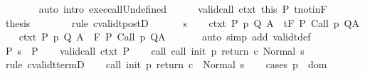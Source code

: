 \begin{isabellebody}
\ \ \ \ \ \ \isamarkupfalse%
\ {\isacharparenleft}auto\ intro{\isacharcolon}\ exec{\isacharunderscore}callUndefined{\isacharparenright}\isanewline
\ \ \ \ \isamarkupfalse%
\ valid{\isacharunderscore}call\ ctxt\ this\ P\ t{\isacharunderscore}notin{\isacharunderscore}F\isanewline
\ \ \ \ \isamarkupfalse%
\ {\isacharquery}thesis\isanewline
\ \ \ \ \ \ \isamarkupfalse%
\ {\isacharparenleft}rule\ cvalidt{\isacharunderscore}postD{\isacharparenright}\isanewline
\ \ \isamarkupfalse%
\isanewline
{}\isamarkupfalse%
\isanewline
\ \ \isamarkupfalse%
\ s\isanewline
\ \ \isamarkupfalse%
\ ctxt{\isacharcolon}\ {\isachardoublequoteopen}{\isasymforall}{\isacharparenleft}P{\isacharcomma}\ p{\isacharcomma}\ Q{\isacharcomma}\ A{\isacharparenright}{\isasymin}{\isasymTheta}{\isachardot}\ {\isasymGamma}\ {\isasymTurnstile}\isactrlsub t\isactrlbsub {\isacharslash}F\isactrlesub \ P\ {\isacharparenleft}Call\ p{\isacharparenright}\ Q{\isacharcomma}A{\isachardoublequoteclose}\isanewline
\ \ \isamarkupfalse%
\ ctxt{\isacharprime}{\isacharcolon}\ {\isachardoublequoteopen}{\isasymforall}{\isacharparenleft}P{\isacharcomma}\ p{\isacharcomma}\ Q{\isacharcomma}\ A{\isacharparenright}{\isasymin}{\isasymTheta}{\isachardot}\ {\isasymGamma}\ {\isasymTurnstile}\isactrlbsub {\isacharslash}F\isactrlesub \ P\ {\isacharparenleft}Call\ p{\isacharparenright}\ Q{\isacharcomma}A{\isachardoublequoteclose}\ \isanewline
\ \ \ \ \isamarkupfalse%
\ {\isacharparenleft}auto\ simp\ add{\isacharcolon}\ validt{\isacharunderscore}def{\isacharparenright}\isanewline
\ \ \isamarkupfalse%
\ P{\isacharcolon}\ {\isachardoublequoteopen}s\ {\isasymin}\ P{\isachardoublequoteclose}\isanewline
\ \ \isamarkupfalse%
\ valid{\isacharunderscore}call\ ctxt\ P\isanewline
\ \ \isamarkupfalse%
\ call{\isacharcolon}\ {\isachardoublequoteopen}{\isasymGamma}{\isasymturnstile}call\ init\ p\ return{\isacharprime}\ c{\isasymdown}\ Normal\ s{\isachardoublequoteclose}\isanewline
\ \ \ \ \isamarkupfalse%
\ {\isacharparenleft}rule\ cvalidt{\isacharunderscore}termD{\isacharparenright}\isanewline
\ \ \isamarkupfalse%
\ {\isachardoublequoteopen}{\isasymGamma}{\isasymturnstile}call\ init\ p\ return\ c\ {\isasymdown}\ Normal\ s{\isachardoublequoteclose}\isanewline
\ \ \isamarkupfalse%
\ {\isacharparenleft}cases\ {\isachardoublequoteopen}p\ {\isasymin}\ dom\ {\isasymGamma}{\isachardoublequoteclose}{\isacharparenright}\isanewline

\end{isabellebody}
